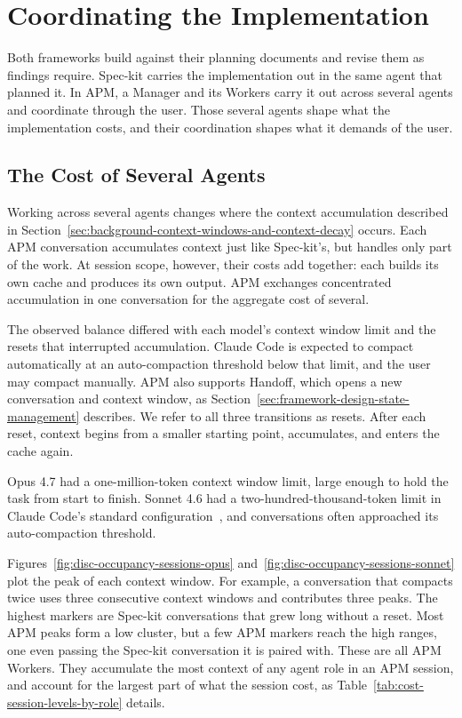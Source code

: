 \section{Coordinating the Implementation}
\label{sec:discussions-implementation}

Both frameworks build against their planning documents and revise them as findings require. Spec-kit carries the implementation out in the same agent that planned it. In APM, a Manager and its Workers carry it out across several agents and coordinate through the user. Those several agents shape what the implementation costs, and their coordination shapes what it demands of the user.

\subsection{The Cost of Several Agents}
\label{sec:discussions-cost-mechanics}

Working across several agents changes where the context accumulation described in Section~\ref{sec:background-context-windows-and-context-decay} occurs. Each APM conversation accumulates context just like Spec-kit's, but handles only part of the work. At session scope, however, their costs add together: each builds its own cache and produces its own output. APM exchanges concentrated accumulation in one conversation for the aggregate cost of several.

The observed balance differed with each model's context window limit and the resets that interrupted accumulation. Claude Code is expected to compact automatically at an auto-compaction threshold below that limit, and the user may compact manually. APM also supports Handoff, which opens a new conversation and context window, as Section~\ref{sec:framework-design-state-management} describes. We refer to all three transitions as resets. After each reset, context begins from a smaller starting point, accumulates, and enters the cache again.

Opus 4.7 had a one-million-token context window limit, large enough to hold the task from start to finish. Sonnet 4.6 had a two-hundred-thousand-token limit in Claude Code's standard configuration~\cite{anthropic2026codemodelconfig}, and conversations often approached its auto-compaction threshold.

Figures~\ref{fig:disc-occupancy-sessions-opus} and~\ref{fig:disc-occupancy-sessions-sonnet} plot the peak of each context window. For example, a conversation that compacts twice uses three consecutive context windows and contributes three peaks. The highest markers are Spec-kit conversations that grew long without a reset. Most APM peaks form a low cluster, but a few APM markers reach the high ranges, one even passing the Spec-kit conversation it is paired with. These are all APM Workers. They accumulate the most context of any agent role in an APM session, and account for the largest part of what the session cost, as Table~\ref{tab:cost-session-levels-by-role} details.

